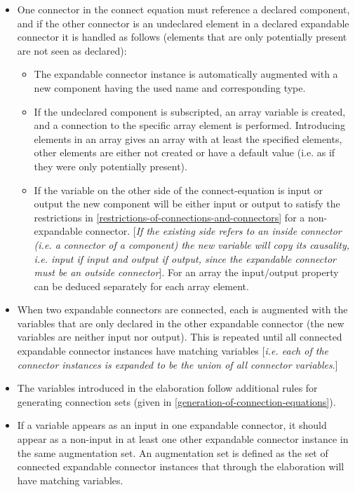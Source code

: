 \begin{itemize}
\item
  One connector in the connect equation must reference a declared
  component, and if the other connector is an undeclared element in a
  declared expandable connector it is handled as follows (elements that
  are only potentially present are not seen as declared):
\begin{itemize}
\item
  The expandable connector instance is automatically augmented with a
  new component having the used name and corresponding type.
\item
  If the undeclared component is subscripted, an array variable is
  created, and a connection to the specific array element is performed.
  Introducing elements in an array gives an array with at least the
  specified elements, other elements are either not created or have a
  default value (i.e. as if they were only potentially present).
\item
  If the variable on the other side of the connect-equation is input or
  output the new component will be either input or output to satisfy the
  restrictions in \ref{restrictions-of-connections-and-connectors} for a non-expandable connector.
  {[}\emph{If the existing side refers to an inside connector (i.e. a
  connector of a component) the new variable will copy its causality,
  i.e. input if input and output if output, since the expandable
  connector must be an outside connector}{]}. For an array the
  input/output property can be deduced separately for each array
  element.
\end{itemize}
\item
  When two expandable connectors are connected, each is augmented with
  the variables that are only declared in the other expandable connector
  (the new variables are neither input nor output). This is repeated
  until all connected expandable connector instances have matching
  variables {[}\emph{i.e. each of the connector instances is expanded to
  be the union of all connector variables}.{]}
\item
  The variables introduced in the elaboration follow additional rules
  for generating connection sets (given in \ref{generation-of-connection-equations}).
\item
  If a variable appears as an input in one expandable connector, it
  should appear as a non-input in at least one other expandable
  connector instance in the same augmentation set. An augmentation set
  is defined as the set of connected expandable connector instances that
  through the elaboration will have matching variables.


\end{itemize}
